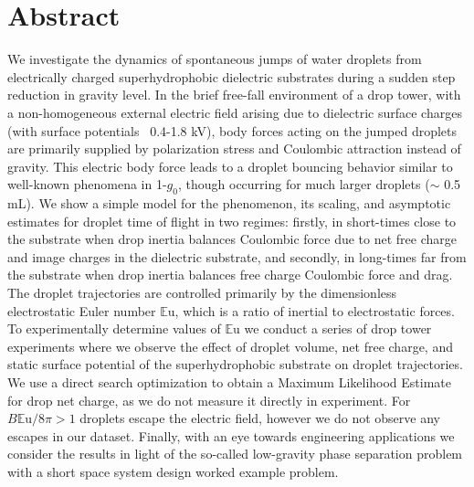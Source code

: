 \documentclass[12pt,a4paper,oneside]{book}
\begin{document}
\section*{Abstract}
\noindent
We investigate the dynamics of spontaneous jumps of water droplets from electrically charged superhydrophobic dielectric substrates during a sudden step reduction in gravity level. In the brief free-fall environment of a drop tower, with a non-homogeneous external electric field arising due to dielectric surface charges (with surface potentials ~0.4-1.8 kV), body forces acting on the jumped droplets are primarily supplied by polarization stress and Coulombic attraction instead of gravity. This electric body force leads to a droplet bouncing behavior similar to well-known phenomena in 1-$g_0$, though occurring for much larger droplets ($\sim$ 0.5 mL). We show a simple model for the phenomenon, its scaling, and asymptotic estimates for droplet time of flight in two regimes: firstly, in short-times close to the substrate when drop inertia balances Coulombic force due to net free charge and image charges in the dielectric substrate, and secondly, in long-times far from the substrate when drop inertia balances free charge Coulombic force and drag. The droplet trajectories are controlled primarily by the dimensionless electrostatic Euler number $\mathbb{E}\mbox{u}$, which is a ratio of inertial to electrostatic forces. To experimentally determine values of $\mathbb{E}\mbox{u}$ we conduct a series of drop tower experiments where we observe the effect of droplet volume, net free charge, and static surface potential of the superhydrophobic substrate on droplet trajectories. We use a direct search optimization to obtain a Maximum Likelihood Estimate for drop net charge, as we do not measure it directly in experiment. For $B \mathbb{E}\mbox{u} /8 \pi > 1$ droplets escape the electric field, however we do not observe any escapes in our dataset. Finally, with an eye towards engineering applications we consider the results in light of the so-called low-gravity phase separation problem with a short space system design worked example problem.

\clearpage

\vspace*{\fill}
\end{document}
